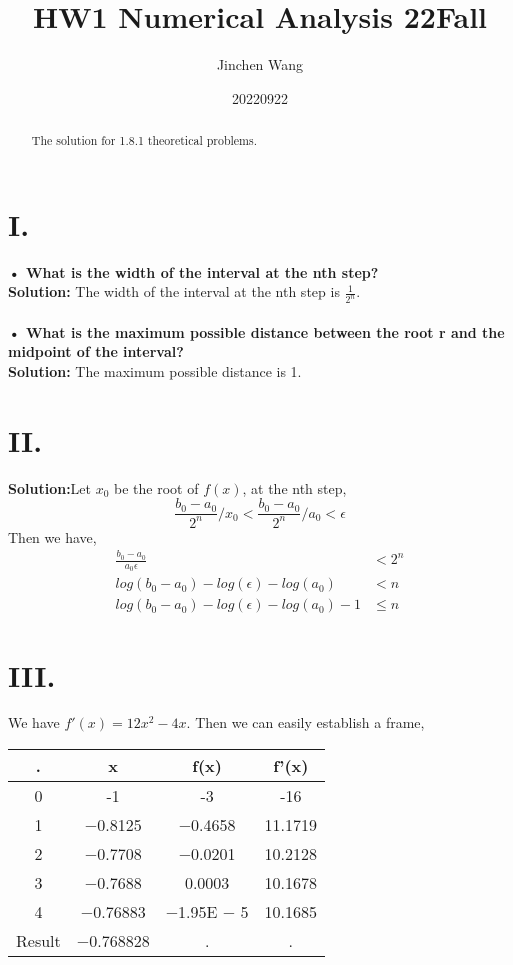 \documentclass{article}
\title{HW1 Numerical Analysis 22Fall}
\author{Jinchen Wang}
\date{20220922}
\begin{document}
\maketitle

\begin{abstract}
\centerline{The solution for 1.8.1 theoretical problems.}
\end{abstract}

\section*{I.}
\textbf{• What is the width of the interval at the nth step?}\\
\textbf{Solution:} The width of the interval at the nth step is $\frac{1}{2^{n}}$.\\
\\
\textbf{• What is the maximum possible distance between the root r and the midpoint of the interval?}\\
\textbf{Solution:} The maximum possible distance is 1.


\section*{II.}
\textbf{Solution:}Let $x_0$ be the root of $f(x)$, at the nth step,\\
$$\frac{b_0-a_0}{2^n}/x_0<\frac{b_0-a_0}{2^n}/a_0<\epsilon$$
Then we have,\\
\begin{equation}
    \begin{aligned}
        \frac{b_0-a_0}{a_0\epsilon}&<2^n\\
        log(b_0-a_0)-log(\epsilon)-log(a_0)&<n\\
        log(b_0-a_0)-log(\epsilon)-log(a_0)-1&\leq n
    \end{aligned}
    \nonumber
\end{equation}

\section*{III.}
We have $f'(x) = 12x^2 - 4x$.
Then we can easily establish a frame,\\

\begin{tabular}{cccc}%
\toprule %
 . & x  &  f(x) & f'(x) \\ %
\midrule %
0 & -1 & -3 & -16 \\
1 & −0.8125 & −0.4658 & 11.1719\\
2 & −0.7708 & −0.0201 & 10.2128 \\
3 & −0.7688 & 0.0003 & 10.1678\\
4 & −0.76883 & −1.95E − 5 & 10.1685\\
Result & −0.768828 &. &.\\

\bottomrule %
\end{tabular}
\end{document}
